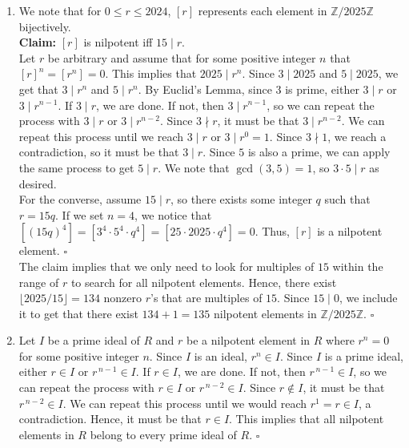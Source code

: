 \documentclass{article}
\begin{document}
\begin{enumerate}
\begin{enumerate}
    \item 
    We note that for $0 \leq r \leq 2024$, $[r]$ represents each element in $\mathbb{Z}/2025\mathbb{Z}$ bijectively. \\
    
    \textbf{Claim:} $[r]$ is nilpotent iff $15 \mid r$. \\

    Let $r$ be arbitrary and assume that for some positive integer $n$ that $[r]^n = [r^n] = 0$. This implies that $2025 \mid r^n$. Since $3 \mid 2025$ and $5 \mid 2025$, we get that $3 \mid r^n$ and $5 \mid r^n$. By Euclid's Lemma, since $3$ is prime, either $3 \mid r$ or $3 \mid r^{n-1}$. If $3 \mid r$, we are done. If not, then $3 \mid r^{n-1}$, so we can repeat the process with $3 \mid r$ or $3 \mid r^{n-2}$. Since $3 \nmid r$, it must be that $3 \mid r^{n-2}$. We can repeat this process until we reach $3 \mid r$ or $3 \mid r^0 = 1$. Since $3 \nmid 1$, we reach a contradiction, so it must be that $3 \mid r$. Since $5$ is also a prime, we can apply the same process to get $5 \mid r$. We note that $\gcd(3,5) = 1$, so $3\cdot 5 \mid r$ as desired. \\

    For the converse, assume $15 \mid r$, so there exists some integer $q$ such that $r = 15q$. If we set $n = 4$, we notice that $[(15q)^4] = [3^4 \cdot 5^4 \cdot q^4] = [25 \cdot 2025 \cdot q^4] = 0$. Thus, $[r]$ is a nilpotent element. \hfill $\square$ \\

    The claim implies that we only need to look for multiples of $15$ within the range of $r$ to search for all nilpotent elements. Hence, there exist $\lfloor 2025/15 \rfloor = 134$ nonzero $r$'s that are multiples of $15$. Since $15 \mid 0$, we include it to get that there exist $134 + 1 = 135$ nilpotent elements in $\mathbb{Z} / 2025\mathbb{Z}$. \hfill $\square$ \\

   \item 
    Let $I$ be a prime ideal of $R$ and $r$ be a nilpotent element in $R$ where $r^n = 0$ for some positive integer $n$. Since $I$ is an ideal, $r^n \in I$. Since $I$ is a prime ideal, either $r \in I$ or $r^{\,n-1} \in I$. If $r \in I$, we are done. If not, then $r^{\,n-1} \in I$, so we can repeat the process with $r \in I$ or $r^{\,n-2} \in I$. Since $r \notin I$, it must be that $r^{\,n-2} \in I$. We can repeat this process until we would reach $r^1 = r\in I$, a contradiction. Hence, it must be that $r \in I$. This implies that all nilpotent elements in $R$ belong to every prime ideal of $R$. \hfill $\square$ \\


\end{enumerate}
\end{enumerate}
\end{document}
